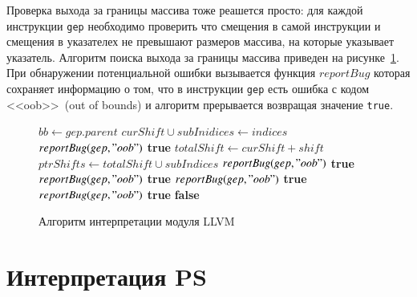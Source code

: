 Проверка выхода за границы массива тоже реашется просто: для каждой инструкции
\texttt{gep} необходимо проверить что смещения в самой инструкции и смещения в 
указателех не превышают размеров массива, на которые указывает указатель. 
Алгоритм поиска выхода за границы массива приведен на 
рисунке~\ref{image:oobChecker}. При обнаружении потенциальной ошибки вызывается
функция $reportBug$ которая сохраняет информацию о том, что в инструкции 
\texttt{gep} есть ошибка с кодом <<oob>>~(out of bounds) и алгоритм 
прерывается возвращая значение \texttt{true}.
\begin{figure}[h!]
\begin{algorithmic}[1]
\State $bb \gets gep.parent$
\State $curShift \cup subInidices \gets indices$
    \State $reportBug(gep, "oob")$
    \State \Return \textbf{true}
            \State $totalShift \gets curShift + shift$
            \State $ptrShifts \gets totalShift \cup subIndices$
                \State $reportBug(gep, "oob")$
                \State \Return \textbf{true}
            \EndIf
        \EndFor
    \EndFor
{}
        \State $reportBug(gep, "oob")$
        \State \Return \textbf{true}
    \EndIf
        \State $reportBug(gep, "oob")$
        \State \Return \textbf{true}
    \EndIf
            \State $reportBug(gep, "oob")$
            \State \Return \textbf{true}
        \EndIf
    \EndFor
\EndIf
\State \Return \textbf{false}    
\EndFunction
\end{algorithmic}
\caption{Алгоритм интерпретации модуля LLVM}
\label{image:oobChecker}
\end{figure}


\section{Интерпретация PS}
